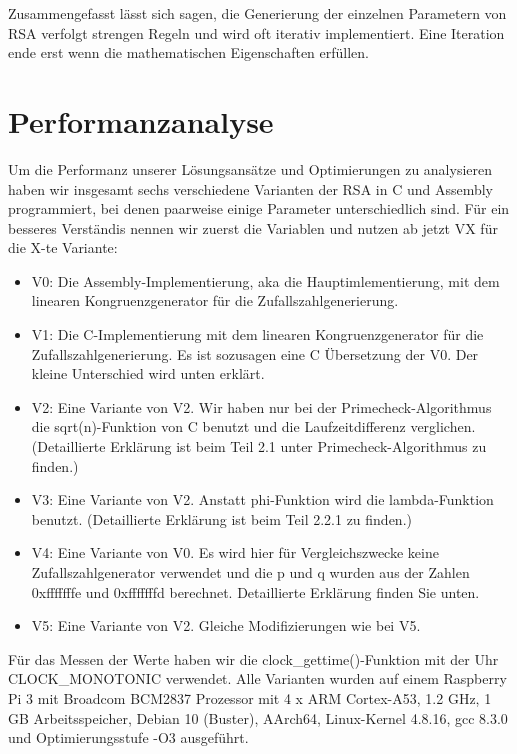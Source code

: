 \documentclass[course=asp]{aspdoc}
\begin{document}
Zusammengefasst lässt sich sagen, die Generierung der einzelnen Parametern von RSA verfolgt strengen Regeln und wird oft iterativ implementiert. Eine Iteration ende erst wenn die mathematischen Eigenschaften erfüllen. 

\section{Performanzanalyse}
Um die Performanz unserer Lösungsansätze und Optimierungen zu analysieren haben wir insgesamt sechs verschiedene Varianten der RSA in C und Assembly programmiert, bei denen paarweise einige Parameter unterschiedlich sind. Für ein besseres Verständis nennen wir zuerst die Variablen und nutzen ab jetzt VX für die X-te Variante:

\begin{itemize}
	\item V0: Die Assembly-Implementierung, aka die Hauptimlementierung, mit dem linearen Kongruenzgenerator für die Zufallszahlgenerierung.
	\item V1: Die C-Implementierung mit dem linearen Kongruenzgenerator für die Zufallszahlgenerierung. Es ist sozusagen eine C Übersetzung der V0. Der kleine Unterschied wird unten erklärt.
	\item V2: Eine Variante von V2. Wir haben nur bei der Primecheck-Algorithmus die sqrt(n)-Funktion von C benutzt und die Laufzeitdifferenz verglichen. (Detaillierte Erklärung ist beim Teil 2.1 unter Primecheck-Algorithmus zu finden.)
	\item V3: Eine Variante von V2. Anstatt phi-Funktion wird die lambda-Funktion benutzt. (Detaillierte Erklärung ist beim Teil 2.2.1 zu finden.)
	\item V4: Eine Variante von V0. Es wird hier für Vergleichszwecke keine Zufallszahlgenerator verwendet und die p und q wurden aus der Zahlen 0xfffffffe und 0xfffffffd berechnet. Detaillierte Erklärung finden Sie unten.
	\item V5: Eine Variante von V2. Gleiche Modifizierungen wie bei V5.
\end{itemize}


Für das Messen der Werte haben wir die clock\_gettime()-Funktion mit der Uhr CLOCK\_MONOTONIC verwendet. Alle Varianten wurden auf einem Raspberry Pi 3 mit Broadcom BCM2837 Prozessor mit 4 x ARM Cortex-A53, 1.2 GHz, 1 GB Arbeitsspeicher, Debian 10 (Buster), AArch64, Linux-Kernel 4.8.16, gcc 8.3.0 und Optimierungsstufe -O3 ausgeführt.
\end{document}
